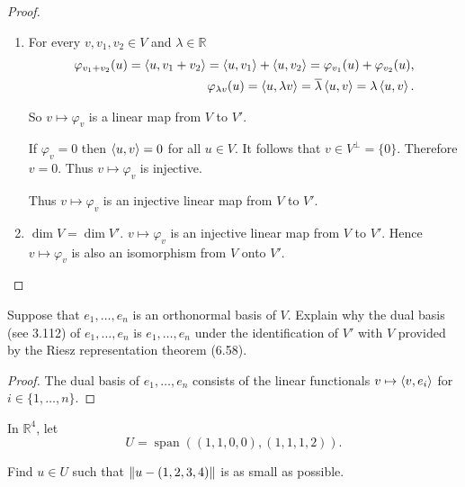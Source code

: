 \begin{proof}
    \begin{enumerate}[label={(\alph*)}]
        \item For every $v, v_{1}, v_{2}\in V$ and $\lambda\in\mathbb{R}$
              \begin{align*}
                  \varphi_{v_{1} + v_{2}}(u) = \left\langle{u, v_{1} + v_{2}}\right\rangle = \left\langle{u, v_{1}}\right\rangle + \left\langle{u, v_{2}}\right\rangle = \varphi_{v_{1}}(u) + \varphi_{v_{2}}(u), \\
                  \varphi_{\lambda v}(u) = \left\langle{u, \lambda v}\right\rangle = \overline{\lambda}\left\langle{u, v}\right\rangle = \lambda\left\langle{u, v}\right\rangle.
              \end{align*}

              So $v\mapsto \varphi_{v}$ is a linear map from $V$ to $V'$.

              If $\varphi_{v} = 0$ then $\left\langle{u, v}\right\rangle = 0$ for all $u\in V$. It follows that $v\in V^{\bot} = \{0\}$. Therefore $v = 0$. Thus $v\mapsto \varphi_{v}$ is injective.

              Thus $v\mapsto \varphi_{v}$ is an injective linear map from $V$ to $V'$.
        \item $\dim V = \dim V'$. $v\mapsto \varphi_{v}$ is an injective linear map from $V$ to $V'$. Hence $v\mapsto \varphi_{v}$ is also an isomorphism from $V$ onto $V'$.
    \end{enumerate}
\end{proof}
\newpage

\begin{exercise}
    Suppose that $e_{1}, \ldots, e_{n}$ is an orthonormal basis of $V$. Explain why the dual basis (see 3.112) of $e_{1}, \ldots, e_{n}$ is $e_{1}, \ldots, e_{n}$ under the identification of $V'$ with $V$ provided by the Riesz representation theorem (6.58).
\end{exercise}

\begin{proof}
    The dual basis of $e_{1}, \ldots, e_{n}$ consists of the linear functionals $v\mapsto \left\langle{v, e_{i}}\right\rangle$ for $i\in\{ 1,\ldots, n \}$.
\end{proof}
\newpage

\begin{exercise}
    In $\mathbb{R}^{4}$, let
    \[
        U = \operatorname{span}((1, 1, 0, 0), (1, 1, 1, 2)).
    \]

    Find $u\in U$ such that $\left\Vert{u - (1, 2, 3, 4)}\right\Vert$ is as small as possible.
\end{exercise}

